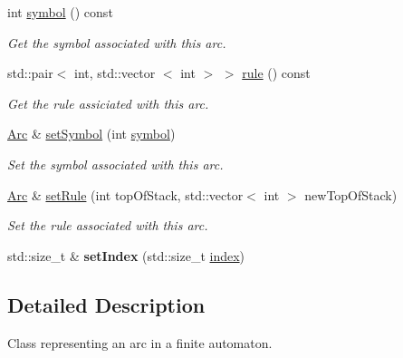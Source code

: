 \begin{DoxyCompactItemize}
int \hyperlink{class_arc_a33a7ffc9c79fff47658aefb4e0e42009}{symbol} () const 
\begin{DoxyCompactList}\small\item\em \-Get the symbol associated with this arc. \end{DoxyCompactList}\item 
std\-::pair$<$ int, std\-::vector\*
$<$ int $>$ $>$ \hyperlink{class_arc_ad94ee1036c1360de10038e0b2d3c8c5c}{rule} () const 
\begin{DoxyCompactList}\small\item\em \-Get the rule assiciated with this arc. \end{DoxyCompactList}\item 
\hyperlink{class_arc}{\-Arc} \& \hyperlink{class_arc_acb63d3a66c7ae2a2ba72c092517c9991}{set\-Symbol} (int \hyperlink{class_arc_a33a7ffc9c79fff47658aefb4e0e42009}{symbol})
\begin{DoxyCompactList}\small\item\em \-Set the symbol associated with this arc. \end{DoxyCompactList}\item 
\hyperlink{class_arc}{\-Arc} \& \hyperlink{class_arc_a0e7ed37d5e5bedf244e3f15af8a53e73}{set\-Rule} (int top\-Of\-Stack, std\-::vector$<$ int $>$ new\-Top\-Of\-Stack)
\begin{DoxyCompactList}\small\item\em \-Set the rule associated with this arc. \end{DoxyCompactList}\item 
\hypertarget{class_arc_a75d49cfef7820d91471090d501f27909}{std\-::size\-\_\-t \& {\bfseries set\-Index} (std\-::size\-\_\-t \hyperlink{class_arc_a9ae84977f950f68095f888e6faf60282}{index})}\label{class_arc_a75d49cfef7820d91471090d501f27909}

\end{DoxyCompactItemize}


\subsection{\-Detailed \-Description}
\-Class representing an arc in a finite automaton. 


